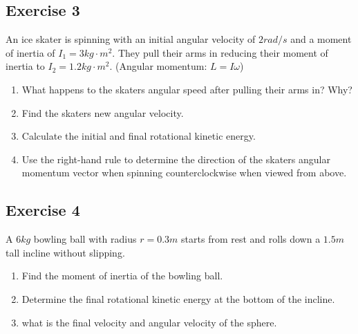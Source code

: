 \documentclass[11pt]{article}
\newenvironment{exercise}{
    \begin{mdframed}[style=problemstyle]\textcolor{black}{}
}{
    \end{mdframed}
}
\begin{document}
\subsection*{Exercise 3}
\begin{exercise}
    An ice skater is spinning with an initial angular velocity of $2rad/s$
    and a moment of inertia of $I_1 = 3 kg\cdot m^2$. They pull their arms 
    in reducing their moment of inertia to $I_2 = 1.2 kg\cdot m^2$.
    (Angular momentum: $L=I\omega$)
    \begin{enumerate}[label=(\alph*)]
        \item What happens to the skaters angular speed after pulling 
            their arms in? Why?
        \item Find the skaters new angular velocity. 
        \item Calculate the initial and final rotational kinetic energy.
        \item Use the right-hand rule to determine the direction of the 
            skaters angular momentum vector when spinning counterclockwise
            when viewed from above.
    \end{enumerate}
\end{exercise}

\subsection*{Exercise 4}
\begin{exercise}
    A $6kg$ bowling ball with radius $r=0.3m$ starts from rest and rolls
    down a $1.5m$ tall incline without slipping.
    \begin{enumerate}[label=(\alph*)]
        \item Find the moment of inertia of the bowling ball.
        \item Determine the final rotational kinetic energy at the 
            bottom of the incline.
        \item what is the final velocity and angular velocity of the sphere.
    \end{enumerate}
\end{exercise}
\end{document}

